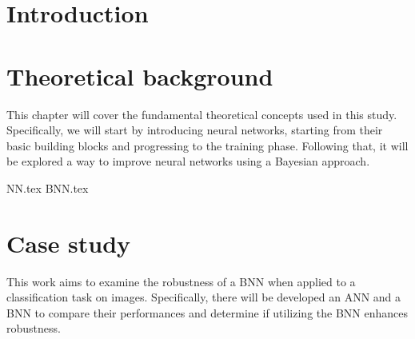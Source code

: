 \documentclass[
	a4paper,
	cleardoublepage=empty,
	headings=twolinechapter,
	numbers=autoenddot,
]{scrbook}
\begin{document}
	\frontmatter
	
	\begin{frontespizio}
		\Margini{3cm}{3cm}{3cm}{3cm}
		\Punteggiatura{}
		\begin{Preambolo*}
			\usepackage[english]{babel}
			\usepackage[T1]{fontenc}
			\usepackage[utf8]{inputenc}
			\usepackage{microtype}
			\usepackage{lmodern}
			\graphicspath{{img/}}
			
			\renewcommand{\frontinstitutionfont}{\fontsize{14}{17}\bfseries\scshape}
			\renewcommand{\fronttitlefont}{\fontsize{17}{21}\bfseries\scshape}
			\renewcommand{\frontfootfont}{\fontsize{12}{14}\bfseries\scshape}
		\end{Preambolo*}
	\end{frontespizio}
	
	\tableofcontents
	\listoffigures
	\mainmatter
	
	\chapter*{Introduction}
	\chapter{Theoretical background}
	This chapter will cover the fundamental theoretical concepts used in this study. Specifically, we will start by introducing neural networks, starting from their basic building blocks and progressing to the training phase. Following that, it will be explored a way to improve neural networks using a Bayesian approach.
	
	{NN.tex}
	{BNN.tex}
		
	\chapter{Case study}
	This work aims to examine the robustness of a BNN when applied to a classification task on images. Specifically, there will be developed an ANN and a BNN to compare their performances and determine if utilizing the BNN enhances robustness.
	
\end{document}
